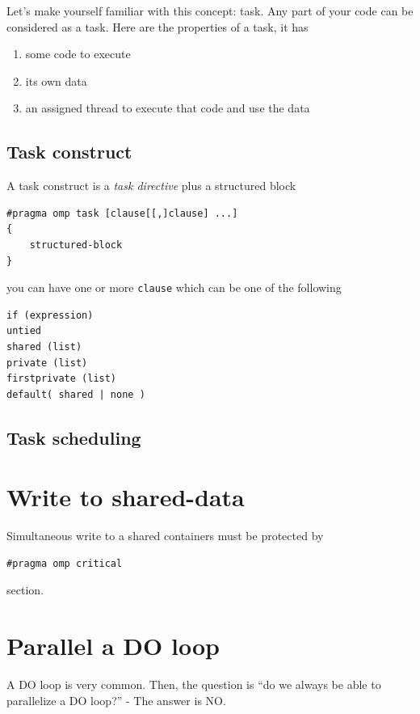 Let's make yourself familiar with this concept: task. Any part of your
code can be considered as a task. Here are the properties of a task,
it has
\begin{enumerate}
\item  some code to execute
\item  its own data
\item  an assigned thread to execute that code and use the data
\end{enumerate}

\subsection{Task construct}
\label{sec:task-construct}

A task construct is a {\it task directive} plus a structured block 
\begin{verbatim}
#pragma omp task [clause[[,]clause] ...]
{       
    structured-block
}
\end{verbatim}
you can have one or more  \verb!clause! which can be one of the
following
\begin{verbatim}
if (expression)
untied
shared (list)
private (list)
firstprivate (list)
default( shared | none )
\end{verbatim}



\subsection{Task scheduling}
\label{sec:task-scheduling}




\section{Write to shared-data}
\label{sec:write-shared-data}

Simultaneous write to a shared containers must be protected by 
\begin{verbatim}
#pragma omp critical
\end{verbatim}
section.

\section{Parallel a DO loop}
\label{sec:parallel-do-loop}

A DO loop is very common. Then, the question is ``do we always be able
to parallelize a DO loop?'' - The answer is NO.


